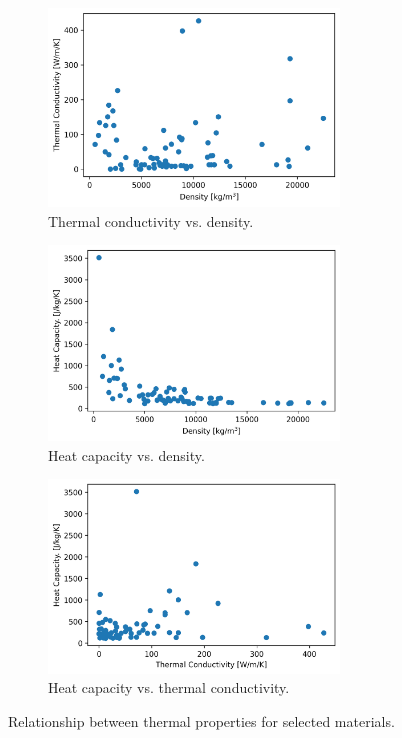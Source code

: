 \begin{figure}[htbp!] %
  \centering
  \begin{subfigure}[b]{0.49\textwidth}
    \centering
    \includegraphics[width=0.85\textwidth]{figures/rho_k}
    \caption{Thermal conductivity vs. density.}
  \end{subfigure}
  \hfill
  \begin{subfigure}[b]{0.49\textwidth}
    \centering
    \includegraphics[width=0.85\textwidth]{figures/rho_cp}
    \caption{Heat capacity vs. density.}
  \end{subfigure}
  \par
  \begin{subfigure}[b]{0.49\textwidth}
    \centering
    \includegraphics[width=0.85\textwidth]{figures/k_cp}
    \caption{Heat capacity vs. thermal conductivity.}
  \end{subfigure}
  \caption{Relationship between thermal properties for selected materials.}
  \label{fig:pre-syn-mats}
\end{figure}


